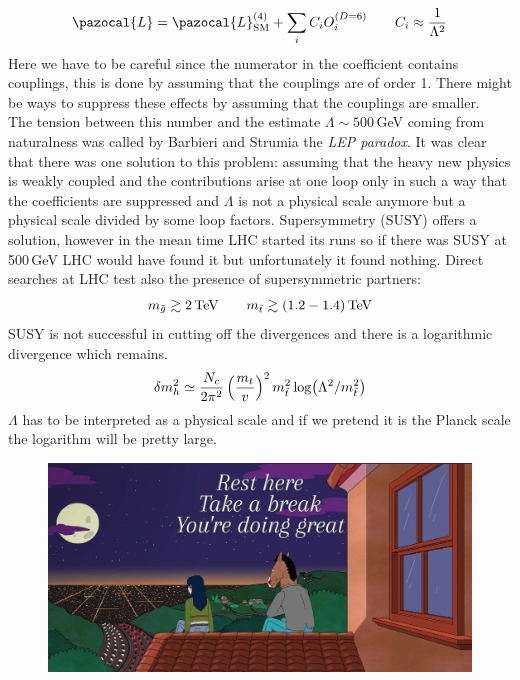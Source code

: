 \documentclass[../main.tex]{subfiles}
\begin{document}
\[
\pazocal{L}=\pazocal{L}_{\text{SM}}^{(4)}+\sum_iC_iO_i^{(D=6)} \qquad C_i\approx\frac{1}{\Lambda^2}
\]
Here we have to be careful since the numerator in the coefficient contains couplings, this is done by assuming that the couplings are of order 1. There might be ways to suppress these effects by assuming that the couplings are smaller.\\
The tension between this number and the estimate $\Lambda\sim500$\,GeV coming from naturalness was called by Barbieri and Strumia the \textit{LEP paradox}. It was clear that there was one solution to this problem: assuming that the heavy new physics is weakly coupled and the contributions arise at one loop only in such a way that the coefficients are suppressed and $\Lambda$ is not a physical scale anymore but a physical scale divided by some loop factors. Supersymmetry (SUSY) offers a solution, however in the mean time LHC started its runs so if there was SUSY at 500\,GeV LHC would have found it but unfortunately it found nothing. Direct searches at LHC test also the presence of supersymmetric partners:
\[
m_{\Tilde{g}}\gtrsim2\,\text{TeV} \qquad m_{\Tilde{t}}\gtrsim(1.2-1.4)\,\text{TeV}
\]
SUSY is not successful in cutting off the divergences and there is a logarithmic divergence which remains. 
\[
\delta m_h^2\simeq\frac{N_c}{2\pi^2}\left(\frac{m_t}{v}\right)^2m_{\Tilde{t}}^2\log(\Lambda^2/m_{\Tilde{t}}^2)
\]
$\Lambda$ has to be interpreted as a physical scale and if we pretend it is the Planck scale the logarithm will be pretty large. 
\begin{figure}[h]
    \centering
    \includegraphics{Images/bojack.jpg}
    \caption*{}
    \label{fig:my_label}
\end{figure}
\end{document}
